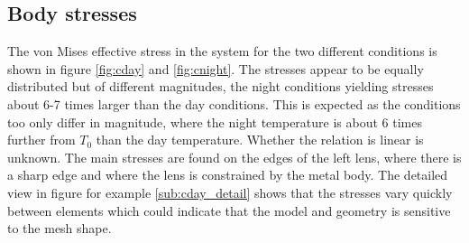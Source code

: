 \documentclass[a4paper,11pt]{article}
\begin{document}
\subsection{Body stresses}
The von Mises effective stress in the system for the two different conditions is shown in figure \ref{fig:cday} and \ref{fig:cnight}. The stresses appear to be equally distributed but of different magnitudes, the night conditions yielding stresses about 6-7 times larger than the day conditions. This is expected as the conditions too only differ in magnitude, where the night temperature is about 6 times further from $T_0$ than the day temperature. Whether the relation is linear is unknown. The main stresses are found on the edges of the left lens, where there is a sharp edge and where the lens is constrained by the metal body. The detailed view in figure for example \ref{sub:cday_detail} shows that the stresses vary quickly between elements which could indicate that the model and geometry is sensitive to the mesh shape.
\end{document}
